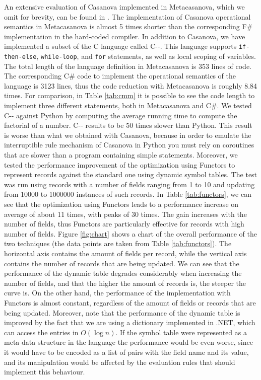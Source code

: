 An extensive evaluation of Casanova implemented in Metacasanova, which we omit for brevity, can be found in \cite{DiGiacomo2017}. The implementation of Casanova operational semantics in Metacasanova is almost 5 times shorter than the corresponding F\# implementation in the hard-coded compiler. In addition to Casanova, we have implemented a subset of the C language called C-{}-. This language supports \texttt{if-then-else}, \texttt{while-loop}, and \texttt{for} statements, as well as local scoping of variables. The total length of the language definition in Metacasanova is 353 lines of code. The corresponding C\# code to implement the operational semantics of the language is 3123 lines, thus the code reduction with Metacasanova is roughly 8.84 times. For comparison, in Table \ref{tab:cmm} it is possible to see the code length to implement three different statements, both in Metacasanova and C\#. We tested C-{}- against Python by computing the average running time to compute the factorial of a number. C-{}- results to be 50 times slower than Python. This result is worse than what we obtained with Casanova, because in order to emulate the interruptible rule mechanism of Casanova in Python you must rely on coroutines that are slower than a program containing simple statements. Moreover, we tested the performance improvement of the optimization using Functors to represent records against the standard one using dynamic symbol tables. The test was run using records with a number of fields ranging from 1 to 10 and updating from 10000 to 1000000 instances of such records. In Table \ref{tab:functors}, we can see that the optimization using Functors leads to a performance increase on average of about 11 times, with peaks of 30 times. The gain increases with the number of fields, thus Functors are particularly effective for records with high number of fields. Figure \ref{fig:chart} shows a chart of the overall performance of the two techniques (the data points are taken from Table \ref{tab:functors}). The horizontal axis contains the amount of fields per record, while the vertical axis contains the number of records that are being updated. We can see that the performance of the dynamic table degrades considerably when increasing the number of fields, and that the higher the amount of records is, the steeper the curve is. On the other hand, the performance of the implementation with Functors is almost constant, regardless of the amount of fields or records that are being updated. Moreover, note that the performance of the dynamic table is improved by the fact that we are using a dictionary implemented in .NET, which can access the entries in $O(\log n)$. If the symbol table were represented as a meta-data structure in the language the performance would be even worse, since it would have to be encoded as a list of pairs with the field name and its value, and its manipulation would be affected by the evaluation rules that should implement this behaviour.


